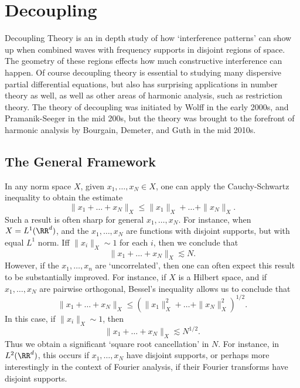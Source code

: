 
\part{Decoupling}

Decoupling Theory is an in depth study of how `interference patterns' can show up when combined waves with frequency supports in disjoint regions of space. The geometry of these regions effects how much constructive interference can happen. Of course decoupling theory is essential to studying many dispersive partial differential equations, but also has surprising applications in number theory as well, as well as other areas of harmonic analysis, such as restriction theory. The theory of decoupling was initiated by Wolff in the early 2000s, and Pramanik-Seeger in the mid 200s, but the theory was brought to the forefront of harmonic analysis by Bourgain, Demeter, and Guth in the mid 2010s.








\chapter{The General Framework}

In any norm space $X$, given $x_1, \dots, x_N \in X$, one can apply the Cauchy-Schwartz inequality to obtain the estimate
%
\[ \| x_1 + \dots + x_N \|_X \leq \| x_1 \|_X + \dots + \| x_N \|_X. \]
%
Such a result is often sharp for general $x_1, \dots, x_N$. For instance, when $X = L^1(\RR^d)$, and the $x_1, \dots, x_N$ are functions with disjoint supports, but with equal $L^1$ norm. Iff $\| x_i \|_X \sim 1$ for each $i$, then we conclude that
%
\[ \| x_1 + \dots + x_N \|_X \lesssim N. \]
%
However, if the $x_1, \dots, x_n$ are `uncorrelated', then one can often expect this result to be substantially improved. For instance, if $X$ is a Hilbert space, and if $x_1, \dots, x_N$ are pairwise orthogonal, Bessel's inequality allows us to conclude that
%
\[ \| x_1 + \dots + x_N \|_X \leq \left( \| x_1 \|_X^2 + \dots + \| x_N \|_X^2 \right)^{1/2}. \]
%
In this case, if $\| x_i \|_X \sim 1$, then
%
\[ \| x_1 + \dots + x_N \|_X \lesssim N^{1/2}. \]
%
Thus we obtain a significant `square root cancellation' in $N$. For instance, in $L^2(\RR^d)$, this occurs if $x_1, \dots, x_N$ have disjoint supports, or perhaps more interestingly in the context of Fourier analysis, if their Fourier transforms have disjoint supports.


